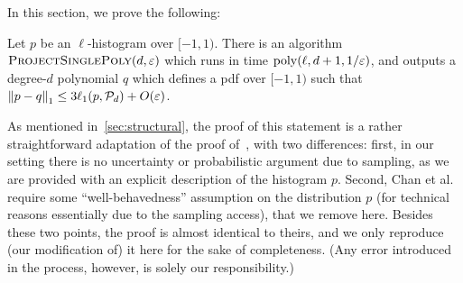 In this section, we prove the following:
\begin{theorem}\label{thm:project:single:poly}
Let $p$ be an $\ell$-histogram over $[-1,1)$. There is an algorithm $\textsc{ProjectSinglePoly}(d,\eps)$
which runs in time $\poly(\ell, d+1,1/\eps)$, and outputs a degree-$d$ polynomial $q$ which defines a pdf over $[-1,1) $
such that $\normone{p-q} \leq 3 \lp[1](p,\classpoly[d]) + O(\eps)$.
\end{theorem}
As mentioned in~\cref{sec:structural}, the proof of this statement is a rather straightforward adaptation of the proof of~\cite[Theorem 9]{CDSS:14}, with two differences: first, in our setting there is no uncertainty or probabilistic argument due to sampling, as we are provided with an explicit description of the histogram $p$. Second, Chan et al. require some ``well-behavedness'' assumption on the distribution $p$ (for technical reasons essentially due to the sampling access), that we remove here. Besides these two points, the proof is almost identical to theirs, and we only reproduce (our modification of) it here for the sake of completeness.
(Any error introduced in the process, however, is solely our responsibility.)
